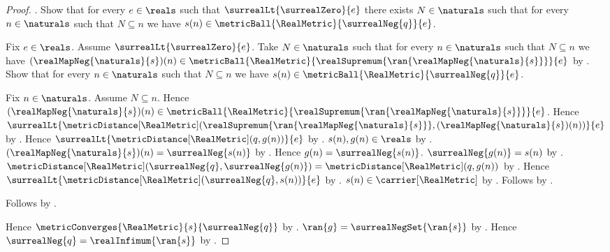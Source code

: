 \begin{proof}
        .
    Show that for every $e\in\reals$ such that
        $\surrealLt{\surrealZero}{e}$ there exists $N\in\naturals$
        such that for every $n\in\naturals$ such that $N\subseteq n$
        we have $s(n)\in\metricBall{\RealMetric}{\surrealNeg{q}}{e}$.
    \begin{subproof}
        Fix $e\in\reals$.
        Assume $\surrealLt{\surrealZero}{e}$.
        Take $N\in\naturals$ such that for every $n\in\naturals$
            such that $N\subseteq n$ we have
            $(\realMapNeg{\naturals}{s})(n)\in
                \metricBall{\RealMetric}
                    {\realSupremum{
                        \ran{\realMapNeg{\naturals}{s}}}}{e}$ by
            .
        Show that for every $n\in\naturals$ such that $N\subseteq n$
            we have $s(n)\in
                \metricBall{\RealMetric}{\surrealNeg{q}}{e}$.
        \begin{subproof}
            Fix $n\in\naturals$.
            Assume $N\subseteq n$.
            Hence $(\realMapNeg{\naturals}{s})(n)\in
                \metricBall{\RealMetric}
                    {\realSupremum{
                        \ran{\realMapNeg{\naturals}{s}}}}{e}$.
            Hence $\surrealLt{\metricDistance[\RealMetric]
                (\realSupremum{\ran{\realMapNeg{\naturals}{s}}},
                    (\realMapNeg{\naturals}{s})(n))}{e}$
                by .
            Hence $\surrealLt{\metricDistance[\RealMetric](q,g(n))}{e}$
                by \auto.
            $s(n),g(n)\in\reals$ by .
            $(\realMapNeg{\naturals}{s})(n)=\surrealNeg{s(n)}$ by
                .
            Hence $g(n)=\surrealNeg{s(n)}$.
            $\surrealNeg{g(n)}=s(n)$ by
                .
            $\metricDistance[\RealMetric]
                    (\surrealNeg{q},\surrealNeg{g(n)})
                =\metricDistance[\RealMetric](q,g(n))$ by
                .
            Hence $\surrealLt{\metricDistance[\RealMetric]
                (\surrealNeg{q},s(n))}{e}$ by \auto.
            $s(n)\in\carrier[\RealMetric]$ by .
            Follows by .
        \end{subproof}
        Follows by \auto.
    \end{subproof}
    Hence $\metricConverges{\RealMetric}{s}{\surrealNeg{q}}$ by
        .
    $\ran{g}=\surrealNegSet{\ran{s}}$ by
        .
    Hence $\surrealNeg{q}=\realInfimum{\ran{s}}$ by
        .
\end{proof}
